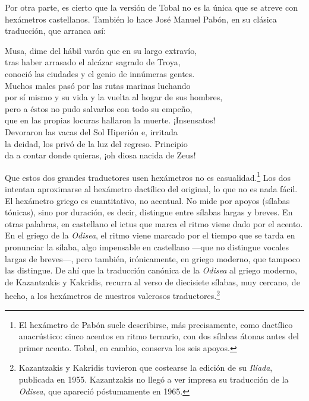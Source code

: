 Por otra parte, es cierto que la versión de Tobal no es la única que se atreve con hexámetros castellanos. También lo hace José Manuel Pabón, en su clásica traducción, que arranca así:

\begin{versocita}
Musa, dime del hábil varón que en su largo extravío,\\
tras haber arrasado el alcázar sagrado de Troya,\\
conoció las ciudades y el genio de innúmeras gentes.\\
Muchos males pasó por las rutas marinas luchando\\
por sí mismo y su vida y la vuelta al hogar de sus hombres,\\
pero a éstos no pudo salvarlos con todo su empeño,\\
que en las propias locuras hallaron la muerte. ¡Insensatos!\\
Devoraron las vacas del Sol Hiperión e, irritada\\
la deidad, los privó de la luz del regreso. Principio\\
da a contar donde quieras, ¡oh diosa nacida de Zeus!
\end{versocita}

Que estos dos grandes traductores usen hexámetros no es casualidad.\footnote{El hexámetro de Pabón suele describirse, más precisamente, como dactílico anacrústico: cinco acentos en ritmo ternario, con dos sílabas átonas antes del primer acento. Tobal, en cambio, conserva los seis apoyos.} Los dos intentan aproximarse al hexámetro dactílico del original, lo que no es nada fácil. El hexámetro griego es cuantitativo, no acentual. No mide por apoyos (sílabas tónicas), sino por duración, es decir, distingue entre sílabas largas y breves. En otras palabras, en castellano el ictus que marca el ritmo viene dado por el acento. En el griego de la \emph{Odisea}, el ritmo viene marcado por el tiempo que se tarda en pronunciar la sílaba, algo impensable en castellano ---que no distingue vocales largas de breves---, pero también, irónicamente, en griego moderno, que tampoco las distingue. De ahí que la traducción canónica de la \emph{Odisea} al griego moderno, de Kazantzakis y Kakridis, recurra al verso de diecisiete sílabas, muy cercano, de hecho, a los hexámetros de nuestros valerosos traductores.\footnote{Kazantzakis y Kakridis tuvieron que costearse la edición de su \emph{Ilíada}, publicada en 1955. Kazantzakis no llegó a ver impresa su traducción de la \emph{Odisea}, que apareció póstumamente en 1965.}

